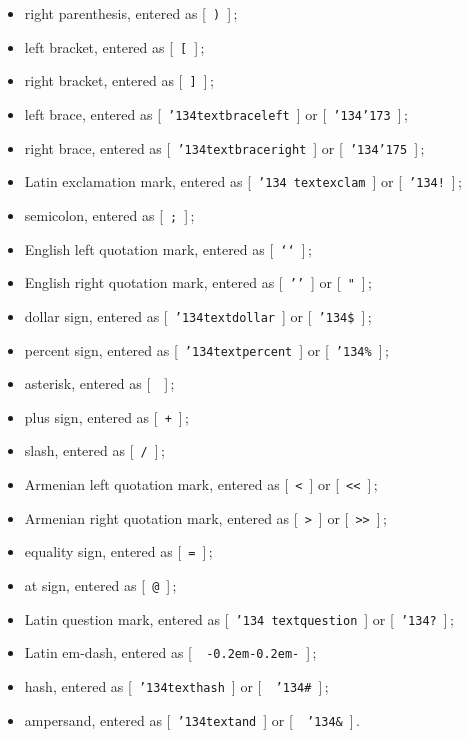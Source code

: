 \documentclass[12pt,a4paper,draft]{article}
\def\mybs{\char'134}
\def\mylbrace{\char'173}
\def\myrbrace{\char'175}
\begin{document}
\begin{itemize}
\item[\artm )]\quad right parenthesis, entered as [~{\tt )}~]$\,$;
\item[{\artm [}]\quad left bracket, entered as [~{\tt [}~]$\,$;
\item[{\artm ]}]\quad right bracket, entered as [~{\tt ]}~]$\,$;
\item[\artm \{]\quad left brace, entered as [~{\tt \mybs textbraceleft}~] or
  [~{\tt \mybs\mylbrace}~]$\,$;
\item[\artm \}]\quad right brace, entered as [~{\tt \mybs textbraceright}~] or
  [~{\tt \mybs\myrbrace}~]$\,$;
\item[\artm \!]\quad Latin exclamation mark, entered as [~{\tt \mybs
    textexclam}~] or [~{\tt \mybs!}~]$\,$;
\item[\artm ;]\quad semicolon, entered as [~{\tt ;}~]$\,$;
\item[\artm ``]\quad English left quotation mark, entered as [~{\tt `{}`}~]$\,$;
\item[\artm '']\quad English right quotation mark, entered as [~{\tt '{}'}~]
  or [~{\tt "}~]$\,$;
\item[\artm \$]\quad dollar sign, entered as [~{\tt \mybs textdollar}~] or
  [~{\tt \mybs\$}~]$\,$;
\item[\artm \%]\quad percent sign, entered as [~{\tt \mybs textpercent}~] or
  [~{\tt \mybs\%}~]$\,$;
\item[\artm *]\quad asterisk, entered as [~{\tt *}~]$\,$;
\item[\artm +]\quad plus sign, entered as [~{\tt +}~]$\,$;
\item[\artm /]\quad slash, entered as [~{\tt /}~]$\,$;
\item[\artm <]\quad Armenian left quotation mark, entered as [~{\tt <}~] or
  [~{\tt <<}~]$\,$;
\item[\artm >]\quad Armenian right quotation mark, entered as [~{\tt >}~] or
  [~{\tt >>}~]$\,$;
\item[\artm =]\quad equality sign, entered as [~{\tt =}~]$\,$;
\item[\artm @]\quad at sign, entered as [~{\tt @}~]$\,$;
\item[\artm \?]\quad Latin question mark, entered as [~{\tt \mybs
    textquestion}~] or [~{\tt \mybs?}~]$\,$;
\item[\artm ---]\quad Latin em-dash, entered as [~{\tt
    -{\kern0.2em}-{\kern0.2em}-}~]$\,$;
\item[\artm \#]\quad hash, entered as [~{\tt \mybs texthash}~] or [~{\tt
    \mybs\#}~]$\,$;
\item[\artm \&]\quad ampersand, entered as [~{\tt \mybs textand}~] or [~{\tt
    \mybs\&}~]$\,$.
\end{itemize}
\end{document}
